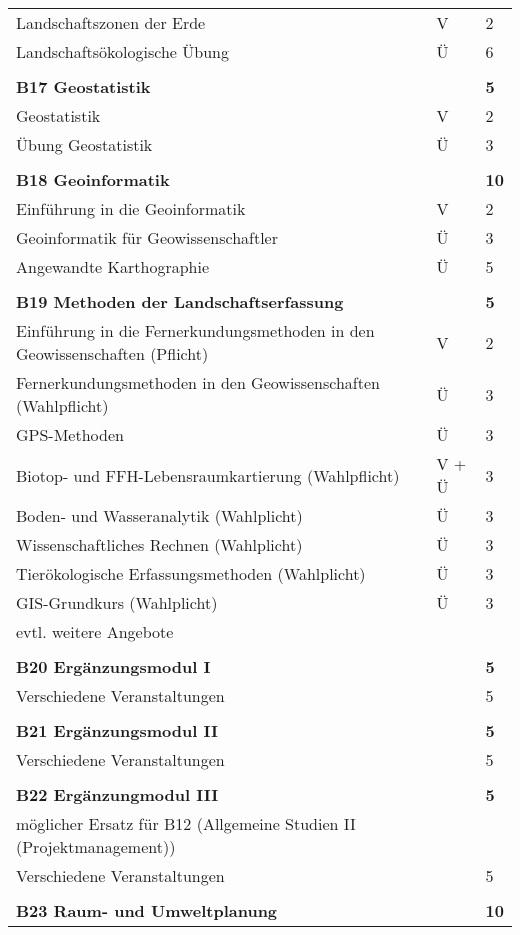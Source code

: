 \begin{longtable}{p{} p{} p{}}
Landschaftszonen der Erde & V & 2\\
Landschaftsökologische Übung & Ü & 6\\
&&\\
\textbf{B17 Geostatistik} && \textbf{5}\\
Geostatistik & V & 2\\
Übung Geostatistik & Ü & 3\\
&&\\
\textbf{B18 Geoinformatik} && \textbf{10}\\
Einführung in die Geoinformatik & V & 2\\
Geoinformatik für Geowissenschaftler & Ü & 3\\
Angewandte Karthographie & Ü & 5\\
&&\\
\textbf{B19 Methoden der Landschaftserfassung}&&\textbf{5}\\
Einführung in die Fernerkundungsmethoden in den Geowissenschaften (Pflicht) & V & 2\\
Fernerkundungsmethoden in den Geowissenschaften (Wahlpflicht) & Ü & 3\\
GPS-Methoden & Ü & 3\\
Biotop- und FFH-Lebensraumkartierung (Wahlpflicht) & V + Ü & 3\\
Boden- und Wasseranalytik (Wahlplicht) & Ü & 3\\
Wissenschaftliches Rechnen (Wahlplicht) & Ü & 3\\
Tierökologische Erfassungsmethoden (Wahlplicht) & Ü & 3\\
GIS-Grundkurs (Wahlplicht)  & Ü & 3\\
evtl. weitere Angebote\\
&&\\
\textbf{B20 Ergänzungsmodul I} && \textbf{5}\\
Verschiedene Veranstaltungen & & 5\\
&&\\
\textbf{B21 Ergänzungsmodul II} && \textbf{5}\\
Verschiedene Veranstaltungen & & 5\\
&&\\
\textbf{B22 Ergänzungmodul III} && \textbf{5}\\
möglicher Ersatz für B12 (Allgemeine Studien II (Projektmanagement))\\
Verschiedene Veranstaltungen & & 5\\
&&\\
\textbf{B23 Raum- und Umweltplanung}&&\textbf{10}\\

\end{longtable}
